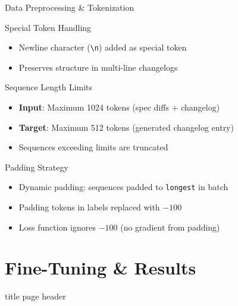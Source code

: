 \documentclass[aspectratio=169]{beamer}
\begin{document}
\begin{frame}{Data Preprocessing \& Tokenization}
\begin{block}{Special Token Handling}
\begin{itemize}
  \item Newline character (\texttt{\textbackslash n}) added as special token
  \item Preserves structure in multi-line changelogs
\end{itemize}
\end{block}

\begin{block}{Sequence Length Limits}
\begin{itemize}
  \item \textbf{Input}: Maximum 1024 tokens (spec diffs + changelog)
  \item \textbf{Target}: Maximum 512 tokens (generated changelog entry)
  \item Sequences exceeding limits are truncated
\end{itemize}
\end{block}

\begin{block}{Padding Strategy}
\begin{itemize}
  \item Dynamic padding: sequences padded to \texttt{longest} in batch
  \item Padding tokens in labels replaced with $-100$
  \item Loss function ignores $-100$ (no gradient from padding)
\end{itemize}
\end{block}
\end{frame}

\section{Fine-Tuning \& Results}
{
\begin{frame}[plain]
  \vfill
  \centering
  \begin{beamercolorbox}[sep=8pt,center]{title page header}
    \insertsection\par
  \end{beamercolorbox}
  \vfill
\end{frame}
}
\end{document}
